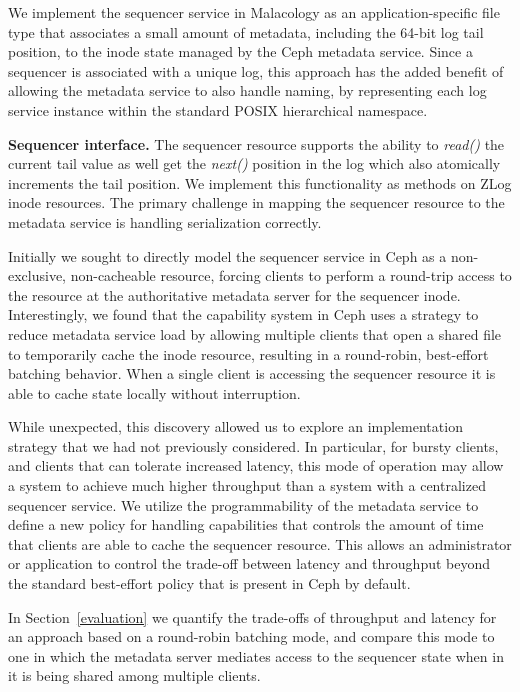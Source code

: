 \documentclass[10pt,twocolumn]{article}
\begin{document}
We implement the sequencer service in Malacology as an application-specific
file type that associates a small amount of metadata, including the 64-bit log
tail position, to the inode state managed by the Ceph metadata service. Since
a sequencer is associated with a unique log, this approach has the added
benefit of allowing the metadata service to also handle naming, by
representing each log service instance within the standard POSIX hierarchical
namespace.

{\bf Sequencer interface.} The sequencer resource supports the ability to
\emph{read()} the current tail value as well get the \emph{next()} position in
the log which also atomically increments the tail position. We implement this
functionality as methods on ZLog inode resources. The primary challenge in
mapping the sequencer resource to the metadata service is handling
serialization correctly.

Initially we sought to directly model the sequencer service in Ceph as a
non-exclusive, non-cacheable resource, forcing clients to perform a round-trip
access to the resource at the authoritative metadata server for the sequencer
inode.  Interestingly, we found that the capability system in Ceph uses a
strategy to reduce metadata service load by allowing multiple clients that
open a shared file to temporarily cache the inode resource, resulting in a
round-robin, best-effort batching behavior. When a single client is accessing
the sequencer resource it is able to cache state locally without interruption.

While unexpected, this discovery allowed us to explore an implementation
strategy that we had not previously considered. In particular, for bursty
clients, and clients that can tolerate increased latency, this mode of operation may
allow a system to achieve much higher throughput than a system with a
centralized sequencer service.
We utilize the programmability of the metadata service to define a new policy
for handling capabilities that controls the amount of time that clients are
able to cache the sequencer resource. This allows an administrator or
application to control the trade-off between latency and throughput beyond the
standard best-effort policy that is present in Ceph by default.

In Section~\ref{evaluation} we quantify the trade-offs of throughput and
latency for an approach based on a round-robin batching mode, and compare this
mode to one in which the metadata server mediates access to the sequencer
state when in it is being shared among multiple clients.
\end{document}
